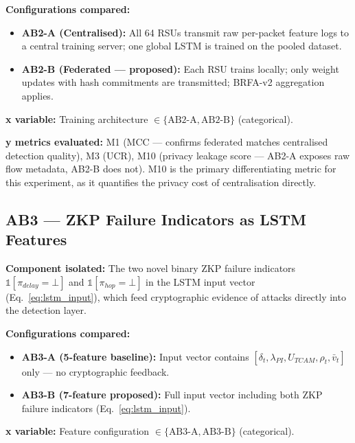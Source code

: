 \documentclass[12pt, a4paper]{report}
\begin{document}
{{\textbf{Configurations compared:}
\begin{itemize}
    \item \textbf{AB2-A (Centralised):} All 64 RSUs
    transmit raw per-packet feature logs to a central
    training server; one global \ac{LSTM} is trained
    on the pooled dataset.
    \item \textbf{AB2-B (Federated — proposed):}
    Each \ac{RSU} trains locally; only weight updates
    with hash commitments are transmitted; BRFA-v2
    aggregation applies.
\end{itemize}

\textbf{x variable:} Training architecture
$\in \{\text{AB2-A}, \text{AB2-B}\}$ (categorical).

\textbf{y metrics evaluated:} M1 (MCC — confirms federated
matches centralised detection quality), M3 (UCR), M10
(privacy leakage score — AB2-A exposes raw flow metadata,
AB2-B does not). M10 is the primary differentiating metric
for this experiment, as it quantifies the privacy cost of
centralisation directly.


\subsection{AB3 — ZKP Failure Indicators as LSTM Features}
\label{sec:ab3}

\textbf{Component isolated:}
The two novel binary \ac{ZKP} failure indicators
$\mathbb{1}[\pi_{delay}{=}\bot]$ and
$\mathbb{1}[\pi_{hop}{=}\bot]$ in the \ac{LSTM} input
vector (Eq.~\ref{eq:lstm_input}), which feed cryptographic
evidence of attacks directly into the detection layer.

\textbf{Configurations compared:}
\begin{itemize}
    \item \textbf{AB3-A (5-feature baseline):}
    Input vector contains $[\delta_t, \lambda_{PI},
    U_{TCAM}, \rho_t, \bar{v}_t]$ only — no
    cryptographic feedback.
    \item \textbf{AB3-B (7-feature proposed):}
    Full input vector including both \ac{ZKP}
    failure indicators (Eq.~\ref{eq:lstm_input}).
\end{itemize}

\textbf{x variable:} Feature configuration
$\in \{\text{AB3-A}, \text{AB3-B}\}$ (categorical).

}}
\end{document}
